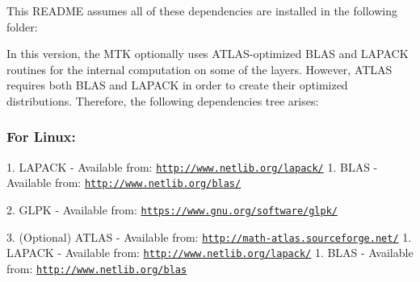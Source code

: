 \begin{DoxyPre}\end{DoxyPre}



\begin{DoxyPre}This README assumes all of these dependencies are installed in the following
folder:\end{DoxyPre}



\begin{DoxyPre}
\end{DoxyPre}



\begin{DoxyPre}In this version, the MTK optionally uses ATLAS-optimized BLAS and LAPACK
routines for the internal computation on some of the layers. However, ATLAS
requires both BLAS and LAPACK in order to create their optimized distributions.
Therefore, the following dependencies tree arises:\end{DoxyPre}



\begin{DoxyPre}\subsubsection*{For Linux:}\end{DoxyPre}



\begin{DoxyPre}\end{DoxyPre}



\begin{DoxyPre}1. LAPACK - Available from: \href{http://www.netlib.org/lapack/}{\tt http://www.netlib.org/lapack/}
  1. BLAS - Available from: \href{http://www.netlib.org/blas/}{\tt http://www.netlib.org/blas/}\end{DoxyPre}



\begin{DoxyPre}2. GLPK - Available from: \href{https://www.gnu.org/software/glpk/}{\tt https://www.gnu.org/software/glpk/}\end{DoxyPre}



\begin{DoxyPre}3. (Optional) ATLAS - Available from: \href{http://math-atlas.sourceforge.net/}{\tt http://math-atlas.sourceforge.net/}
  1. LAPACK - Available from: \href{http://www.netlib.org/lapack/}{\tt http://www.netlib.org/lapack/}
    1. BLAS - Available from: \href{http://www.netlib.org/blas}{\tt http://www.netlib.org/blas}\end{DoxyPre}




